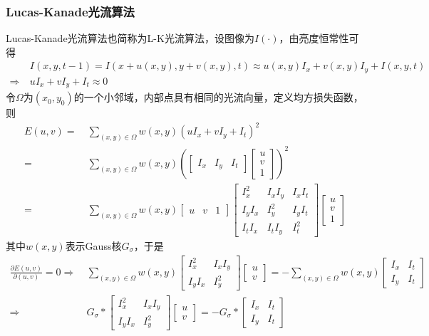 \documentclass[12pt, a4paper, oneside]{ctexart}
\numberwithin{equation}{section}  %
\theoremstyle{definition}
\begin{document}
\subsubsection{Lucas-Kanade光流算法}  %
Lucas-Kanade光流算法也简称为L-K光流算法，设图像为$I(\cdot)$，由亮度恒常性可得
\begin{align*}
    &\ I(x,y,t-1) = I(x+u(x,y),y+v(x,y),t)\approx u(x,y)I_x+v(x,y)I_y+I(x,y,t)\\
    \Rightarrow&\ uI_x+vI_y+I_t\approx 0
\end{align*}
令$\Omega$为$(x_0,y_0)$的一个小邻域，内部点具有相同的光流向量，定义均方损失函数，则
\begin{align*}
    E(u,v) =&\ \sum_{(x,y)\in\Omega}w(x,y)(uI_x+vI_y+I_t)^2\\
    =&\ \sum_{(x,y)\in\Omega}w(x,y)\left(\begin{bmatrix}
        I_x&I_y&I_t
    \end{bmatrix}\begin{bmatrix}
        u\\v\\1
    \end{bmatrix}\right)^2\\
    =&\ \sum_{(x,y)\in\Omega}w(x,y)\begin{bmatrix}
        u&v&1
    \end{bmatrix}\begin{bmatrix}
        I_x^2&I_xI_y&I_xI_t\\
        I_yI_x&I_y^2&I_yI_t\\
        I_tI_x&I_tI_y&I_t^2
    \end{bmatrix}\begin{bmatrix}
        u\\v\\1
    \end{bmatrix}
\end{align*}
其中$w(x,y)$表示Gauss核$G_\sigma$，于是
\begin{align*}
    \frac{\partial E(u,v)}{\partial (u,v)} = 0
    \Rightarrow&\ 
    \sum_{(x,y)\in\Omega}w(x,y)\begin{bmatrix}
        I_x^2&I_xI_y\\
        I_yI_x&I_y^2
    \end{bmatrix}\begin{bmatrix}
        u\\v
    \end{bmatrix} = -\sum_{(x,y)\in\Omega}w(x,y)\begin{bmatrix}
        I_x&I_t\\I_y&I_t
    \end{bmatrix}\\
    \Rightarrow&\ 
    G_\sigma*\begin{bmatrix}
        I_x^2&I_xI_y\\
        I_yI_x&I_y^2
    \end{bmatrix}\begin{bmatrix}
        u\\v
    \end{bmatrix} = -G_\sigma*\begin{bmatrix}
        I_x&I_t\\I_y&I_t
    \end{bmatrix}
\end{align*}
\end{document}
